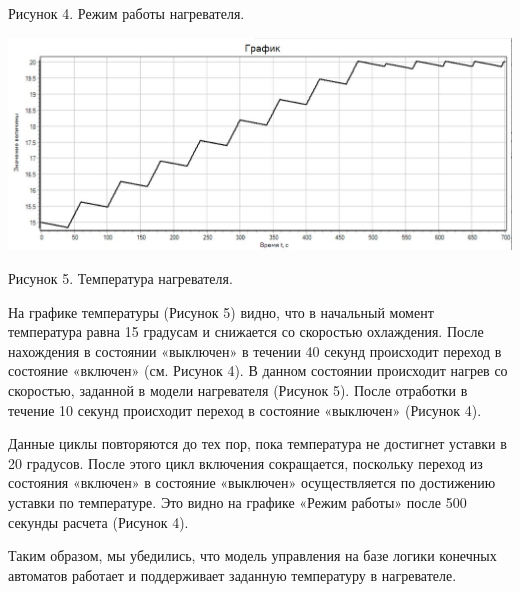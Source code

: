 \documentclass{article}
\begin{document}
\caption{Рисунок 4. Режим работы нагревателя.}

\includegraphics[width=0.9\linewidth]{view_6.JPG}

\caption{Рисунок 5. Температура нагревателя.}

На графике температуры (Рисунок  5) видно, что в начальный момент температура равна 15 градусам и снижается со скоростью охлаждения. После нахождения в состоянии «выключен» в течении 40 секунд происходит переход в состояние «включен» (см. Рисунок  4). В данном состоянии происходит нагрев со скоростью, заданной в модели нагревателя (Рисунок  5). После отработки в течение 10 секунд происходит переход в состояние «выключен» (Рисунок  4). 

Данные циклы повторяются до тех пор, пока температура не достигнет уставки в 20 градусов. После этого цикл включения сокращается, поскольку переход из состояния «включен» в состояние «выключен» осуществляется по достижению уставки по температуре. Это видно на графике «Режим работы» после 500 секунды расчета (Рисунок  4).

Таким образом, мы убедились, что модель управления на базе логики
конечных автоматов работает и поддерживает заданную температуру в
нагревателе.

\end{document}
